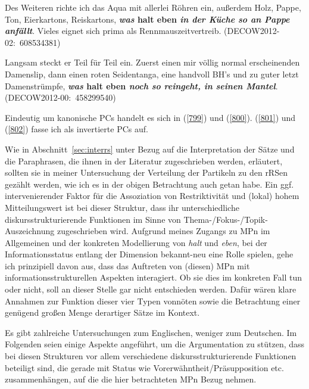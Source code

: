 \begin{exe}
	\ex\label{801} 
	\scriptsize
	Des Weiteren richte ich das Aqua mit allerlei Röhren ein, außerdem Holz, Pappe, Ton, Eierkartons, Reiskartons, 					\textbf{\textit{was} halt eben \textit{in der Küche so an Pappe anfällt}}. Vieles eignet sich prima als 						Rennmauszeitvertreib.    	
	\hfill\hbox{(DECOW2012-02: 608534381)}
\end{exe}

\begin{exe}
	\ex\label{802} 
	\scriptsize
	Langsam steckt er Teil für Teil ein. Zuerst einen mir völlig normal erscheinenden Damenslip, dann einen roten Seidentanga, 		eine handvoll BH's und zu guter letzt Damenstrümpfe, \textbf{\textit{was} halt eben \textit{noch so reingeht, in seinen 		Mantel}}.                      	
	\hfill\hbox{(DECOW2012-00: 458299540)}
\end{exe}
Eindeutig um kanonische PCs handelt es sich in (\ref{799}) und (\ref{800}). (\ref{801}) und (\ref{802}) fasse ich als invertierte PCs auf.

Wie in Abschnitt~\ref{sec:interrs} unter Bezug auf die Interpretation der Sätze und die Paraphrasen, die ihnen in der Literatur zugeschrieben werden, erläutert, sollten sie in meiner Untersuchung der Verteilung der Partikeln zu den rRSen gezählt werden, wie ich es in der obigen Betrachtung auch getan habe. Ein ggf. intervenierender Faktor für die Assoziation von Restriktivität und (lokal) hohem Mitteilungswert ist bei dieser Struktur, dass ihr unterschiedliche diskursstruktu\-rierende Funktionen im Sinne von Thema-/Fokus-/Topik-Auszeichnung zugeschrie\-ben wird. Aufgrund meines Zugangs zu MPn im Allgemeinen und der konkreten Modellierung von \textit{halt} und \textit{eben}, bei der Informationsstatus entlang der Dimension \glq bekannt-neu\grq {} eine Rolle spielen, gehe ich prinzipiell davon aus, dass das Auftreten von (diesen) MPn mit informationsstrukturellen Aspekten interagiert. Ob sie dies im konkreten Fall tun oder nicht, soll an dieser Stelle gar nicht entschie\-den werden. Dafür wären klare Annahmen zur Funktion dieser vier Typen vonnöten sowie die Betrachtung einer genügend großen Menge derartiger Sätze im Kontext.

Es gibt zahlreiche Untersuchungen zum Englischen, weniger zum Deutschen. Im Folgenden seien einige Aspekte angeführt, um die Argumentation zu stützen, dass bei diesen Strukturen vor allem verschiedene diskursstrukturierende Funktionen beteiligt sind, die gerade mit Status wie Vorerwähntheit/Präsupposition etc. zusammenhängen, auf die die hier betrachteten MPn Bezug nehmen.

